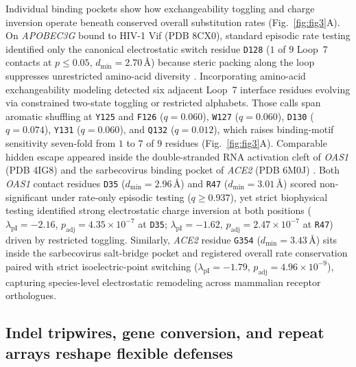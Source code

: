 \documentclass[12pt]{article}
\begin{document}
Individual binding pockets show how exchangeability toggling and charge inversion operate beneath conserved overall substitution rates (Fig.~\ref{fig:fig3}A). On \textit{APOBEC3G} bound to HIV-1 Vif (PDB 8CX0), standard episodic rate testing identified only the canonical electrostatic switch residue \texttt{D128} ($1$ of $9$ Loop~7 contacts at $p \le 0.05$, $d_{\min} = 2.70$\,\AA) because steric packing along the loop suppresses unrestricted amino-acid diversity \cite{li2023a3g,guo2014vif}. Incorporating amino-acid exchangeability modeling detected six adjacent Loop~7 interface residues evolving via constrained two-state toggling or restricted alphabets. Those calls span aromatic shuffling at \texttt{Y125} and \texttt{F126} ($q = 0.060$), \texttt{W127} ($q = 0.060$), \texttt{D130} ($q = 0.074$), \texttt{Y131} ($q = 0.060$), and \texttt{Q132} ($q = 0.012$), which raises binding-motif sensitivity seven-fold from $1$ to $7$ of $9$ residues (Fig.~\ref{fig:fig3}A). Comparable hidden escape appeared inside the double-stranded RNA activation cleft of \textit{OAS1} (PDB 4IG8) and the sarbecovirus binding pocket of \textit{ACE2} (PDB 6M0J) \cite{donovan2013oas1,lan2020structure,chan2020engineering}. Both \textit{OAS1} contact residues \texttt{D35} ($d_{\min} = 2.96$\,\AA) and \texttt{R47} ($d_{\min} = 3.01$\,\AA) scored non-significant under rate-only episodic testing ($q \ge 0.937$), yet strict biophysical testing identified strong electrostatic charge inversion at both positions ($\lambda_{\mathrm{pI}} = -2.16$, $p_{\mathrm{adj}} = 4.35 \times 10^{-7}$ at \texttt{D35}; $\lambda_{\mathrm{pI}} = -1.62$, $p_{\mathrm{adj}} = 2.47 \times 10^{-7}$ at \texttt{R47}) driven by restricted toggling. Similarly, \textit{ACE2} residue \texttt{G354} ($d_{\min} = 3.43$\,\AA) sits inside the sarbecovirus salt-bridge pocket and registered overall rate conservation paired with strict isoelectric-point switching ($\lambda_{\mathrm{pI}} = -1.79$, $p_{\mathrm{adj}} = 4.96 \times 10^{-9}$), capturing species-level electrostatic remodeling across mammalian receptor orthologues.

\subsection*{Indel tripwires, gene conversion, and repeat arrays reshape flexible defenses}
\end{document}
